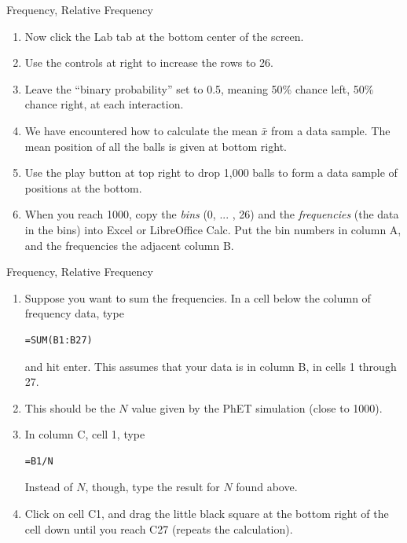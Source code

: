 \documentclass{beamer}
\begin{document}
\begin{frame}{Frequency, Relative Frequency}
\small
\begin{enumerate}
\item Now click the Lab tab at the bottom center of the screen.
\item Use the controls at right to increase the rows to 26.
\item Leave the ``binary probability'' set to 0.5, meaning 50\% chance left, 50\% chance right, at each interaction.
\item We have encountered how to calculate the mean $\bar{x}$ from a data sample.  The mean position of all the balls is given at bottom right.
\item Use the play button at top right to drop 1,000 balls to form a data sample of positions at the bottom.
\item When you reach 1000, copy the \textit{bins} (0, ... , 26) and the \textit{frequencies} (the data in the bins) into Excel or LibreOffice Calc.  Put the bin numbers in column A, and the frequencies the adjacent column B.
\end{enumerate}
\end{frame}

\begin{frame}[fragile]{Frequency, Relative Frequency}
\small
\begin{enumerate}
\item Suppose you want to sum the frequencies.  In a cell below the column of frequency data, type
\begin{verbatim}
=SUM(B1:B27)
\end{verbatim}
and hit enter.  This assumes that your data is in column B, in cells 1 through 27.
\item This should be the $N$ value given by the PhET simulation (close to 1000).
\item In column C, cell 1, type
\begin{verbatim}
=B1/N
\end{verbatim}
Instead of $N$, though, type the result for $N$ found above.
\item Click on cell C1, and drag the little black square at the bottom right of the cell down until you reach C27 (repeats the calculation).
\end{enumerate}
\end{frame}
\end{document}
